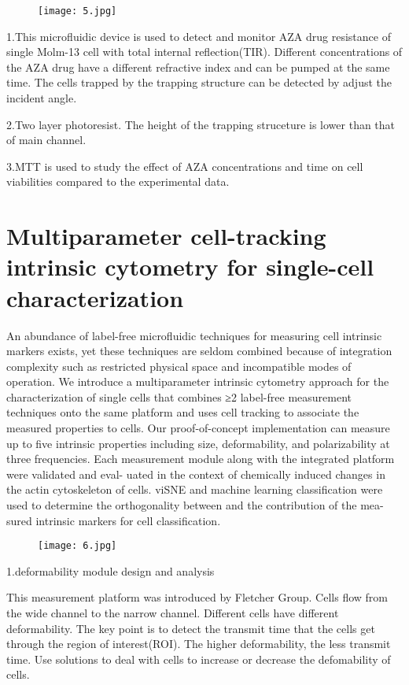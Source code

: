 \documentclass{article}
\begin{document}
\begin{figure}[H]
\centering
\texttt{[image: 5.jpg]}
\end{figure}


1.This microfluidic device is used to detect and monitor AZA drug resistance  of single Molm-13 cell with total internal reflection(TIR). Different concentrations of the AZA drug have a different refractive index and can be pumped at the same time. The cells trapped by the trapping structure can be detected by adjust the incident angle.

2.Two layer photoresist. The height of the trapping struceture is lower than that of main channel.

3.MTT is used to study the effect of AZA concentrations and time on cell viabilities compared to the experimental data. 


\part{Multiparameter cell-tracking intrinsic cytometry for single-cell characterization}

An abundance of label-free microfluidic techniques for measuring cell intrinsic markers exists, yet these techniques are seldom combined because of integration complexity such as restricted physical space and incompatible modes of operation. We introduce a multiparameter intrinsic cytometry approach for the characterization of single cells that combines ≥2 label-free measurement techniques onto the same platform and uses cell tracking to associate the measured properties to cells. Our proof-of-concept implementation can measure up to five intrinsic properties including size, deformability, and polarizability at three frequencies. Each measurement module along with the integrated platform were validated and eval- uated in the context of chemically induced changes in the actin cytoskeleton of cells. viSNE and machine learning classification were used to determine the orthogonality between and the contribution of the mea- sured intrinsic markers for cell classification.
\begin{figure}[H]
\centering
\texttt{[image: 6.jpg]}
\end{figure}

1.deformability module design and analysis

This measurement platform was introduced by Fletcher Group. Cells flow from the wide channel to the narrow channel. Different cells have different deformability. The key point is to detect the transmit time that the cells get through the region of interest(ROI). The higher deformability, the less transmit time. Use solutions to deal with cells to increase or decrease the defomability of cells. 
\end{document}
